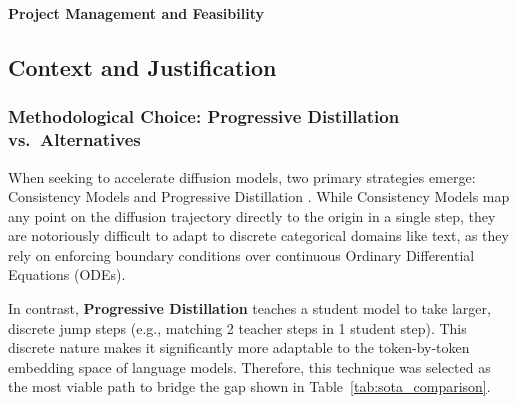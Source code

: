 \documentclass[11pt, a4paper]{article}
\begin{document}

\newpage
\thispagestyle{fancy}
\vspace*{3cm}
\begin{center}
    {\LARGE\bfseries Project Management and Feasibility}
\end{center}
\label{sec:gep}

\subsection*{Context and Justification}
\label{subsec:context_justification}

\subsubsection*{Methodological Choice: Progressive Distillation vs.\ Alternatives}
When seeking to accelerate diffusion models, two primary strategies emerge: Consistency Models \cite{song2023consistency} and Progressive Distillation \cite{salimans2022progressive}. While Consistency Models map any point on the diffusion trajectory directly to the origin in a single step, they are notoriously difficult to adapt to discrete categorical domains like text, as they rely on enforcing boundary conditions over continuous Ordinary Differential Equations (ODEs).

In contrast, \textbf{Progressive Distillation} teaches a student model to take larger, discrete jump steps (e.g., matching 2 teacher steps in 1 student step). This discrete nature makes it significantly more adaptable to the token-by-token embedding space of language models. Therefore, this technique was selected as the most viable path to bridge the gap shown in Table~\ref{tab:sota_comparison}.

\begin{table}[H]
\centering
\caption{Comparison of Generation Paradigms and the Thesis Gap}
\label{tab:sota_comparison}
\end{table}
\end{document}

